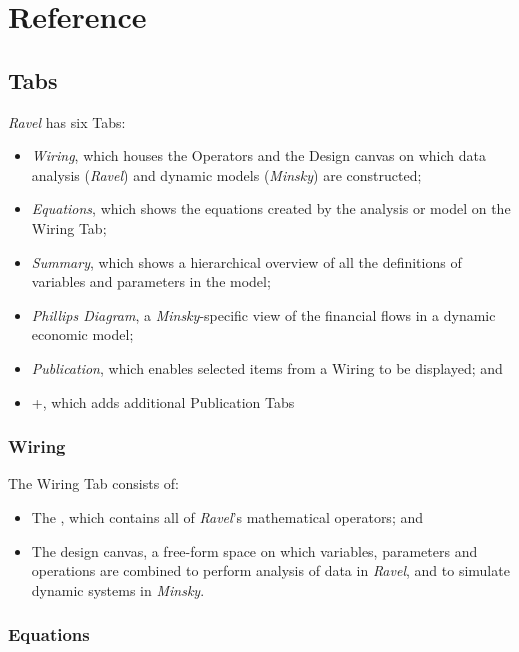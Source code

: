 \newcommand\operatorKey[1]{
  \begin{center}
    \texttt{[image: images/\#1]}
  \end{center}
  }

\chapter{Reference}

\section{Tabs}

\emph{Ravel} has six Tabs:
\begin{itemize}
\item \emph{Wiring}, which houses the Operators and the Design canvas on
which data analysis (\emph{Ravel}) and dynamic models (\emph{Minsky})
are constructed;
\item \emph{Equations}, which shows the equations created by the analysis
or model on the Wiring Tab;
\item \emph{Summary}, which shows a hierarchical overview of all the definitions
of variables and parameters in the model;
\item \emph{Phillips Diagram}, a \emph{Minsky}-specific view of the financial
flows in a dynamic economic model;
\item \emph{Publication}, which enables selected items from a Wiring to
be displayed; and
\item +, which adds additional Publication Tabs
\end{itemize}

\subsection{Wiring}

The Wiring Tab consists of:
\begin{itemize}
\item The , which contains all of \emph{Ravel}'s
mathematical operators; and
\item The design canvas, a free-form space on which variables, parameters
and operations are combined to perform analysis of data in \emph{Ravel},
and to simulate dynamic systems in \emph{Minsky}.
\end{itemize}

\subsection{Equations}

